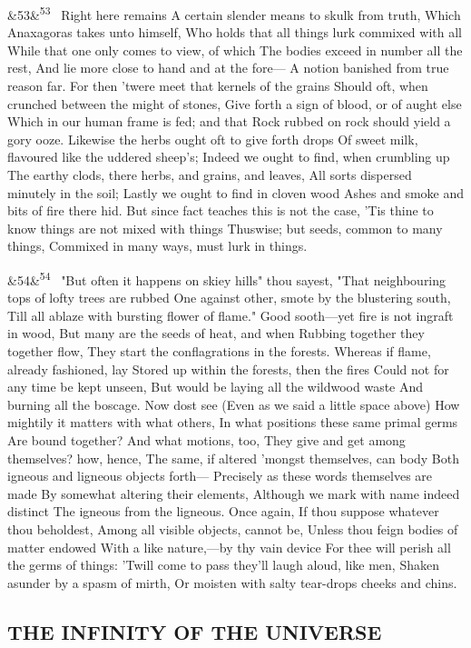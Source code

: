 \documentclass[12pt]{article}
\newcommand{\para}[1][]{\par\noindent\ifx&#1&\else\textsuperscript{\footnotesize #1}~\fi}
\begin{document}
\para[53] Right here remains A certain slender means to skulk from truth, Which Anaxagoras takes unto himself, Who holds that all things lurk commixed with all While that one only comes to view, of which The bodies exceed in number all the rest, And lie more close to hand and at the fore--- A notion banished from true reason far. For then 'twere meet that kernels of the grains Should oft, when crunched between the might of stones, Give forth a sign of blood, or of aught else Which in our human frame is fed; and that Rock rubbed on rock should yield a gory ooze. Likewise the herbs ought oft to give forth drops Of sweet milk, flavoured like the uddered sheep's; Indeed we ought to find, when crumbling up The earthy clods, there herbs, and grains, and leaves, All sorts dispersed minutely in the soil; Lastly we ought to find in cloven wood Ashes and smoke and bits of fire there hid. But since fact teaches this is not the case, 'Tis thine to know things are not mixed with things Thuswise; but seeds, common to many things, Commixed in many ways, must lurk in things.

\para[54] "But often it happens on skiey hills" thou sayest, "That neighbouring tops of lofty trees are rubbed One against other, smote by the blustering south, Till all ablaze with bursting flower of flame." Good sooth---yet fire is not ingraft in wood, But many are the seeds of heat, and when Rubbing together they together flow, They start the conflagrations in the forests. Whereas if flame, already fashioned, lay Stored up within the forests, then the fires Could not for any time be kept unseen, But would be laying all the wildwood waste And burning all the boscage. Now dost see (Even as we said a little space above) How mightily it matters with what others, In what positions these same primal germs Are bound together? And what motions, too, They give and get among themselves? how, hence, The same, if altered 'mongst themselves, can body Both igneous and ligneous objects forth--- Precisely as these words themselves are made By somewhat altering their elements, Although we mark with name indeed distinct The igneous from the ligneous. Once again, If thou suppose whatever thou beholdest, Among all visible objects, cannot be, Unless thou feign bodies of matter endowed With a like nature,---by thy vain device For thee will perish all the germs of things: 'Twill come to pass they'll laugh aloud, like men, Shaken asunder by a spasm of mirth, Or moisten with salty tear-drops cheeks and chins.

\subsection*{THE INFINITY OF THE UNIVERSE}
\end{document}
